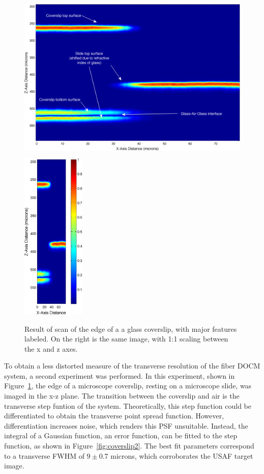 \begin{figure}[h!]
\centering
\includegraphics[height=230pt]{Images/Results/coverslip_ann.png}
\includegraphics[height=230pt]{Images/Results/coverslip_equal.png}
\caption[Result of scan of the edge of a a glass coverslip.]{Result of scan of the edge of a a glass coverslip, with major features labeled. On the right is the same image, with 1:1 scaling between the x and z axes.\label{fig:coverslip1}}
\end{figure}

To obtain a less distorted measure of the transverse resolution of the fiber DOCM system, a second experiment was performed. In this experiment, shown in Figure~\ref{fig:coverslip1}, the edge of a microscope coverslip, resting on a microscope slide, was imaged in the x-z plane. The transition between the coverslip and air is the transverse step funtion of the system. Theoretically, this step function could be differentiated to obtain the transverse point spread function. However, differentiation increases noise, which renders this PSF unsuitable. Instead, the integral of a Gaussian function, an error function, can be fitted to the step function, as shown in Figure~\ref{fig:coverslip2}. The best fit parameters correspond to a transverse FWHM of $9 \pm 0.7$ microns, which corroborates the USAF target image.

